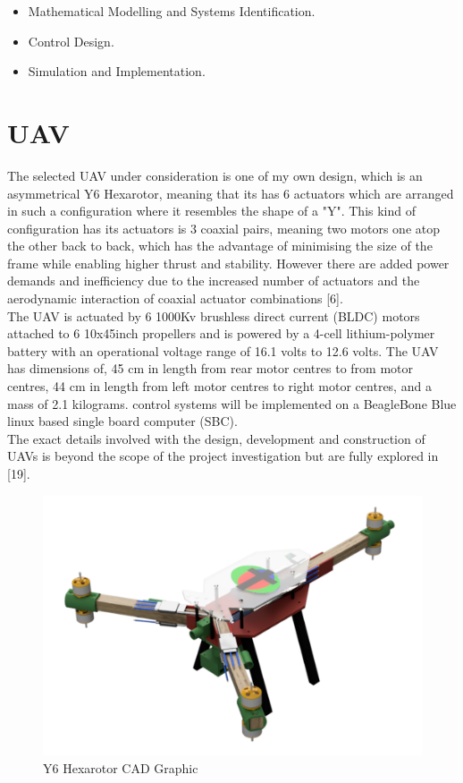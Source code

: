 \documentclass[12pt,a4paper,twoside]{report}
\begin{document}
		\begin{itemize}
			\item 
				Mathematical Modelling and Systems Identification.
			\item
				Control Design.
			\item
				Simulation and Implementation.
		\end{itemize}
				
		\section*{UAV}
		
			The selected UAV under consideration is one of my own design, which is an asymmetrical Y6 Hexarotor, meaning that its has 6 actuators which are arranged in such a configuration where it resembles the shape of  a "Y". This kind of configuration has its actuators is 3 coaxial pairs, meaning two motors one atop the other back to back, which has the advantage of minimising the size of the frame while enabling higher thrust and stability. However there are added power demands and inefficiency due to the increased number of actuators and the aerodynamic interaction of coaxial actuator combinations [6].
			\\
			The UAV is actuated by 6 1000Kv brushless direct current (BLDC) motors attached to 6 10x45inch propellers and is powered by a 4-cell lithium-polymer battery with an operational voltage range of 16.1 volts to 12.6 volts. The UAV has dimensions of, 45 cm in length from rear motor centres to from motor centres, 44 cm in length from left motor centres to right motor centres, and a mass of 2.1 kilograms. control systems will be implemented on a BeagleBone Blue linux based single board computer (SBC).
			\\
			The exact details involved with the design, development and construction of UAVs is beyond the scope of the project investigation but are fully explored in [19].
			\\
			
			\begin{figure}[h!]
				\centering
				\includegraphics[width=0.6\linewidth]{Y6_Hexarotor2.png}
				\caption{Y6 Hexarotor CAD Graphic}
				\label{fig:Y6Hexarotor}
			\end{figure} 
		  
\end{document}
